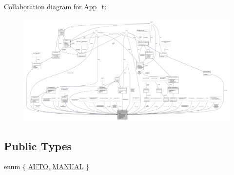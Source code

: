 Collaboration diagram for App\+\_\+t\+:
\nopagebreak
\begin{figure}[H]
\begin{center}
\leavevmode
\includegraphics[width=350pt]{struct_app__t__coll__graph}
\end{center}
\end{figure}
\subsection*{Public Types}
\begin{DoxyCompactItemize}
\item 
enum \{ \hyperlink{struct_app__t_a5e83b2b466859d023f75d213296d45bba8e562f1ce440faab4559e50ae787d9f2}{A\+U\+TO}, 
\hyperlink{struct_app__t_a5e83b2b466859d023f75d213296d45bbab7494cd8bd02a875606473d500db1b74}{M\+A\+N\+U\+AL}
 \}
\end{DoxyCompactItemize}
